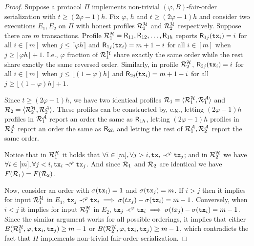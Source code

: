 \begin{proof}
    Suppose a protocol $\Pi$ implements non-trivial $(\varphi, B)$-fair-order serialization with $t \ge (2\varphi - 1)h$.
    Fix $\varphi$, $h$ and $t \ge (2\varphi - 1)h$ and consider two executions $E_1, E_2$ on $\Pi$ with honest profiles $\mathcal{R}^\mathcal{H}_1$ and $\mathcal{R}^\mathcal{H}_2$ respectively.
    Suppose there are $m$ transactions.
    Profile $\mathcal{R}^\mathcal{H}_1 = \mathsf{R}_{11}, \mathsf{R}_{12}, \ldots, \mathsf{R}_{1h}$ reports $\mathsf{R}_{1j}(\mathtt{tx}_i) = i$ for all $i \in [m]$ when $j \le \lceil \varphi h \rceil$ and $\mathsf{R}_{1j}(\mathtt{tx}_i) = m + 1 - i$ for all $i \in [m]$ when  $j \ge \lceil \varphi h \rceil + 1$.
    I.e., $\varphi$ fraction of $\mathcal{R}^\mathcal{H}_1$ share exactly the same order while the rest share exactly the same reversed order.
    Similarly, in profile $\mathcal{R}^\mathcal{H}_2$, $\mathsf{R}_{2j}(\mathtt{tx}_i) = i$ for all  $i \in [m]$ when $j \le \lfloor (1 - \varphi) h \rfloor$ and $\mathsf{R}_{2j}(\mathtt{tx}_i) = m + 1 - i$ for all $j \ge \lfloor (1 - \varphi) h \rfloor + 1$.

    Since $t \ge (2\varphi - 1)h$, we have two identical profiles $\mathcal{R}_1 = \langle \mathcal{R}^\mathcal{H}_1, \mathcal{R}^\mathcal{A}_1 \rangle$ and $\mathcal{R}_2 =  \langle \mathcal{R}^\mathcal{H}_2, \mathcal{R}^\mathcal{A}_2 \rangle$.
    These profiles can be constructed by, e.g., letting $(2\varphi - 1)h$ profiles in $\mathcal{R}^\mathcal{A}_1$ report an order the same as $\mathsf{R}_{1h}$, letting  $(2\varphi - 1)h$ profiles in $\mathcal{R}^\mathcal{A}_2$ report an order the same as $\mathsf{R}_{2h}$ and letting the rest of $\mathcal{R}^\mathcal{A}_1, \mathcal{R}^\mathcal{A}_2$ report the same order.

    Notice that in $\mathcal{R}^\mathcal{H}_1$ it holds that $\forall i \in [m], \forall j > i, \mathtt{tx}_i \prec^\varphi \mathtt{tx}_j$; and in $\mathcal{R}^\mathcal{H}_2$ we have $\forall i \in [m], \forall j < i, \mathtt{tx}_i \prec^\varphi \mathtt{tx}_j$.
    And since $\mathcal{R}_1$ and $\mathcal{R}_2$ are identical we have $F(\mathcal{R}_1) = F(\mathcal{R}_2)$.

    Now, consider an order \orderOutput with $\sigma(\mathtt{tx}_i) = 1$ and $\sigma(\mathtt{tx}_j) = m$.
    If $i > j$ then it implies for input $\mathcal{R}^\mathcal{H}_1$ in $E_1$, $\mathtt{tx}_j \prec^\varphi \mathtt{tx}_i \implies \sigma(tx_j) - \sigma(\mathtt{tx}_i) = m - 1$.
    Conversely, when $i < j$ it implies for input $\mathcal{R}^\mathcal{H}_2$ in $E_2$, $\mathtt{tx}_j \prec^\varphi \mathtt{tx}_i \implies \sigma(tx_j) - \sigma(\mathtt{tx}_i) = m - 1$.
    Since the similar argument works for all possible orderings, it implies that either $B(\mathcal{R}^\mathcal{H}_1, \varphi, \mathtt{tx}_i, \mathtt{tx}_j) \ge m - 1$ or $B(\mathcal{R}^\mathcal{H}_2, \varphi, \mathtt{tx}_i, \mathtt{tx}_j) \ge m - 1$, which contradicts the fact that $\Pi$ implements non-trivial fair-order serialization.
\end{proof}

